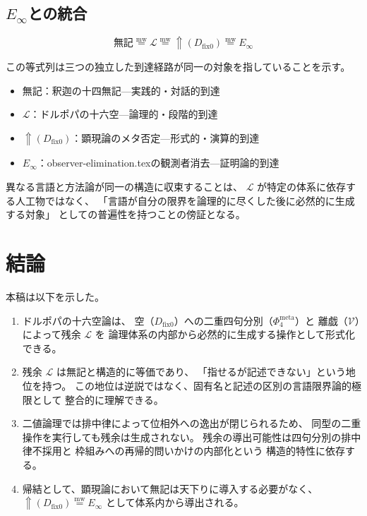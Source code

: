 \documentclass[11pt,a4paper]{article}
\theoremstyle{definition}
\newcommand{\mweq}{\mathrel{\overset{\mathrm{mw}}{=}}}
\newcommand{\dfix}{D_{\mathrm{fix}0}}
\newcommand{\Einfty}{E_\infty}
\newcommand{\metanegation}{\Uparrow}
\newcommand{\Phimeta}{\Phi_{4}^{\mathrm{meta}}}
\begin{document}
\subsection{$\Einfty$との統合}

$$\text{無記} \mweq \mathcal{L} \mweq \metanegation(\dfix) \mweq \Einfty$$

この等式列は三つの独立した到達経路が同一の対象を指していることを示す。

\begin{itemize}
  \item $\text{無記}$：釈迦の十四無記---実践的・対話的到達
  \item $\mathcal{L}$：ドルポパの十六空---論理的・段階的到達
  \item $\metanegation(\dfix)$：顕現論のメタ否定---形式的・演算的到達
  \item $\Einfty$：observer-elimination.texの観測者消去---証明論的到達
\end{itemize}

異なる言語と方法論が同一の構造に収束することは、
$\mathcal{L}$ が特定の体系に依存する人工物ではなく、
「言語が自分の限界を論理的に尽くした後に必然的に生成する対象」
としての普遍性を持つことの傍証となる。

\section{結論}

本稿は以下を示した。

\begin{enumerate}
  \item ドルポパの十六空論は、
        空（$\dfix$）への二重四句分別（$\Phimeta$）と
        離戯（$\mathcal{V}$）によって残余 $\mathcal{L}$ を
        論理体系の内部から必然的に生成する操作として形式化できる。

  \item 残余 $\mathcal{L}$ は無記と構造的に等価であり、
        「指せるが記述できない」という地位を持つ。
        この地位は逆説ではなく、固有名と記述の区別の言語限界論的極限として
        整合的に理解できる。

  \item 二値論理では排中律によって位相外への逸出が閉じられるため、
        同型の二重操作を実行しても残余は生成されない。
        残余の導出可能性は四句分別の排中律不採用と
        枠組みへの再帰的問いかけの内部化という
        構造的特性に依存する。

  \item 帰結として、顕現論において無記は天下りに導入する必要がなく、
        $\metanegation(\dfix) \mweq \Einfty$
        として体系内から導出される。
\end{enumerate}
\end{document}
